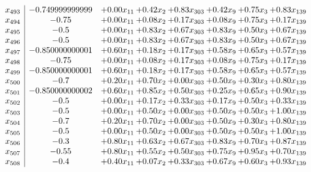 \documentclass[8pt]{article}
\begin{document}
\[\begin{array}{c| c c@{\hskip 2pt} c@{\hskip 2pt} c@{\hskip 2pt} c@{\hskip 2pt} c@{\hskip 2pt} c@{\hskip 2pt} }
 x_{493}   &  -0.749999999999 & +  0.00 x_{11} & +  0.42 x_{2} & +  0.83 x_{303} & +  0.42 x_{9} & +  0.75 x_{3} & +  0.83 x_{139}\\
 x_{494}   &  -0.75 & +  0.00 x_{11} & +  0.08 x_{2} & +  0.17 x_{303} & +  0.08 x_{9} & +  0.75 x_{3} & +  0.17 x_{139}\\
 x_{495}   &  -0.5 & +  0.00 x_{11} & +  0.83 x_{2} & +  0.67 x_{303} & +  0.83 x_{9} & +  0.50 x_{3} & +  0.67 x_{139}\\
 x_{496}   &  -0.5 & +  0.00 x_{11} & +  0.83 x_{2} & +  0.67 x_{303} & +  0.83 x_{9} & +  0.50 x_{3} & +  0.67 x_{139}\\
 x_{497}   &  -0.850000000001 & +  0.60 x_{11} & +  0.18 x_{2} & +  0.17 x_{303} & +  0.58 x_{9} & +  0.65 x_{3} & +  0.57 x_{139}\\
 x_{498}   &  -0.75 & +  0.00 x_{11} & +  0.08 x_{2} & +  0.17 x_{303} & +  0.08 x_{9} & +  0.75 x_{3} & +  0.17 x_{139}\\
 x_{499}   &  -0.850000000001 & +  0.60 x_{11} & +  0.18 x_{2} & +  0.17 x_{303} & +  0.58 x_{9} & +  0.65 x_{3} & +  0.57 x_{139}\\
 x_{500}   &  -0.7 & +  0.20 x_{11} & +  0.70 x_{2} & +  0.00 x_{303} & +  0.50 x_{9} & +  0.30 x_{3} & +  0.80 x_{139}\\
 x_{501}   &  -0.850000000002 & +  0.60 x_{11} & +  0.85 x_{2} & +  0.50 x_{303} & +  0.25 x_{9} & +  0.65 x_{3} & +  0.90 x_{139}\\
 x_{502}   &  -0.5 & +  0.00 x_{11} & +  0.17 x_{2} & +  0.33 x_{303} & +  0.17 x_{9} & +  0.50 x_{3} & +  0.33 x_{139}\\
 x_{503}   &  -0.5 & +  0.00 x_{11} & +  0.50 x_{2} & +  0.00 x_{303} & +  0.50 x_{9} & +  0.50 x_{3} & +  1.00 x_{139}\\
 x_{504}   &  -0.7 & +  0.20 x_{11} & +  0.70 x_{2} & +  0.00 x_{303} & +  0.50 x_{9} & +  0.30 x_{3} & +  0.80 x_{139}\\
 x_{505}   &  -0.5 & +  0.00 x_{11} & +  0.50 x_{2} & +  0.00 x_{303} & +  0.50 x_{9} & +  0.50 x_{3} & +  1.00 x_{139}\\
 x_{506}   &  -0.3 & +  0.80 x_{11} & +  0.63 x_{2} & +  0.67 x_{303} & +  0.83 x_{9} & +  0.70 x_{3} & +  0.87 x_{139}\\
 x_{507}   &  -0.55 & +  0.80 x_{11} & +  0.55 x_{2} & +  0.50 x_{303} & +  0.75 x_{9} & +  0.95 x_{3} & +  0.70 x_{139}\\
 x_{508}   &  -0.4 & +  0.40 x_{11} & +  0.07 x_{2} & +  0.33 x_{303} & +  0.67 x_{9} & +  0.60 x_{3} & +  0.93 x_{139}\\

\end{array}\]
\end{document}
